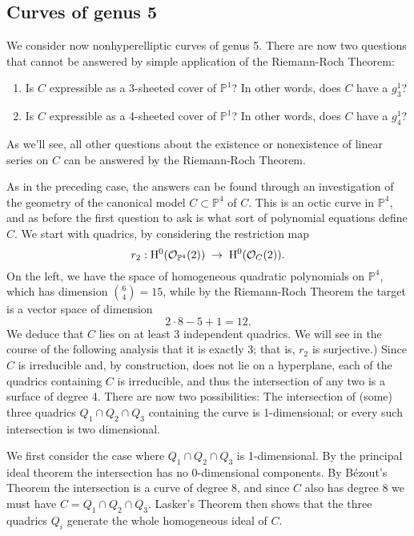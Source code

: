 \documentclass[12pt, leqno]{article}
\def\PP{{\mathbb P}}
\def\cO{{\cal O}}
\begin{document}


\subsection{Curves of genus 5}

We consider now nonhyperelliptic curves of genus 5. There are now two questions that cannot be answered by simple application of the Riemann-Roch Theorem:

\begin{enumerate}
\item Is $C$ expressible as a 3-sheeted cover of $\PP^1$? In other words, does $C$ have a $g^1_3$?
\item Is $C$ expressible as a 4-sheeted cover of $\PP^1$? In other words, does $C$ have a $g^1_4$?
\end{enumerate}

As we'll see, all other questions about the existence or nonexistence of linear series on $C$ can be answered by the Riemann-Roch Theorem.

As in the preceding case, the answers can be found through an investigation of the geometry of the canonical model $C \subset \PP^4$ of $C$. This is an octic curve in $\PP^4$, and as before the first question to ask is what sort of polynomial equations define $C$. We start with quadrics, by considering the restriction map
$$
r_2 : \HH^0(\cO_{\PP^4}(2)) \; \to \; \HH^0(\cO_{C}(2)).
$$
On the left, we have the space of homogeneous quadratic polynomials on $\PP^4$, which has dimension $\binom{6}{4} = 15$, while by the Riemann-Roch Theorem the target is a vector space of dimension
$$
2\cdot8 - 5 + 1 = 12.
$$
We deduce that $C$ lies on at least 3 independent quadrics. We will see in the course of the following analysis that it is exactly 3; that is, $r_2$ is surjective.) Since $C$ is irreducible and, by construction, does not lie on a hyperplane, each of the quadrics containing $C$ is irreducible, and thus the intersection of any two is a surface of degree 4. There are now two possibilities:  The intersection of (some) three quadrics $Q_1 \cap Q_2 \cap Q_3$ containing the curve is 1-dimensional; or every such intersection is two dimensional. 

We first consider the case where $Q_1 \cap Q_2 \cap Q_3$ is 1-dimensional. By the principal ideal theorem the intersection has no 0-dimensional components. By B\'ezout's Theorem the intersection is a curve of degree 8, and since $C$ also has degree 8 we must have $C=Q_1 \cap Q_2 \cap Q_3$. Lasker's Theorem then shows that the three quadrics $Q_i$ generate the whole homogeneous ideal of $C$.
\end{document}
